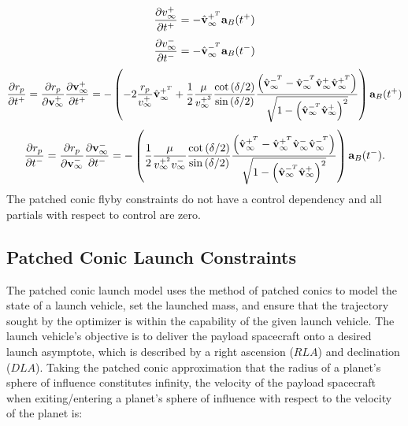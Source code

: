 \begin{equation}
	\frac{\partial v_{\infty}^+}{\partial t^+} = - \hat{\mathbf{v}}_{\infty}^{+^T} \mathbf{a}_B(t^+)
\end{equation}
%
\begin{equation}
	\frac{\partial v_{\infty}^-}{\partial t^-} = - \hat{\mathbf{v}}_{\infty}^{-^T} \mathbf{a}_B(t^-)
\end{equation}
%
\begin{equation}
    \frac{\partial r_p}{\partial t^+} = \frac{\partial r_p}{\partial \mathbf{v}_{\infty}^+}\frac{\partial \mathbf{v}_{\infty}^+}{\partial t^+} =
    - \left(-2\frac{r_p}{v_{\infty}^+}\hat{\mathbf{v}}_{\infty}^{+^T} + \frac{1}{2}\frac{\mu}{v_{\infty}^{+^3}}        \frac{\cot{(\delta/2})}{\sin{(\delta/2)}}
     \frac{ \left( \hat{\mathbf{v}}_{\infty}^{-^T} - \hat{\mathbf{v}}_{\infty}^{-^T} \hat{\mathbf{v}}_{\infty}^{+} \hat{\mathbf{v}}_{\infty}^{+^T} \right)}{\sqrt{1 - \left(\hat{\mathbf{v}}_{\infty}^{-^T} \hat{\mathbf{v}}_{\infty}^{+}\right)^2}}  \right)\mathbf{a}_B(t^+)
\end{equation}
%
\begin{equation}
    \frac{\partial r_p}{\partial t^-} = \frac{\partial r_p}{\partial \mathbf{v}_{\infty}^-}\frac{\partial \mathbf{v}_{\infty}^-}{\partial t^-} =  -\left( \frac{1}{2}\frac{\mu}{v_{\infty}^{+^2} v_{\infty}^{-}} \frac{\cot{(\delta/2})}{\sin{(\delta/2)}}
     \frac{ \left( \hat{\mathbf{v}}_{\infty}^{+^T} - \hat{\mathbf{v}}_{\infty}^{+^T} \hat{\mathbf{v}}_{\infty}^{-} \hat{\mathbf{v}}_{\infty}^{-^T} \right)}{\sqrt{1 - \left(\hat{\mathbf{v}}_{\infty}^{-^T} \hat{\mathbf{v}}_{\infty}^{+}\right)^2}}\right)\mathbf{a}_B(t^-).
\end{equation}
%
The patched conic flyby constraints do not have a control dependency and all partials with respect to control are zero.




\subsection{Patched Conic Launch Constraints}
The patched conic launch model uses the method of patched conics to model the state of a launch vehicle, set the launched mass, and ensure that the trajectory sought by the optimizer is within the capability of the given launch vehicle. The launch vehicle's objective is to deliver the payload spacecraft onto a desired launch asymptote, which is described by a right ascension ($RLA$) and declination ($DLA$). Taking the patched conic approximation that the radius of a planet's sphere of influence constitutes infinity, the velocity of the payload spacecraft when exiting/entering a planet's sphere of influence with respect to the velocity of the planet is:

